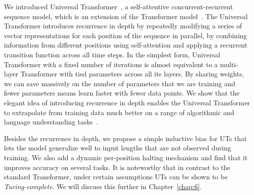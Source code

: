 We introduced Universal Transformer~\citep{Dehghani:ICLR:2019}, a self-attentive concurrent-recurrent sequence model, which is an extension of the Transformer model~\citep{vaswani2017attention}. The Universal Transformer introduces recurrence in depth by repeatedly modifying a series of vector representations for each position of the sequence in parallel, by combining information from different positions using self-attention and applying a recurrent transition function across all time steps. 
In the simplest form, Universal Transformer with a fixed number of iterations is almost equivalent to a multi-layer Transformer with tied parameters across all its layers. By sharing weights, we can save massively on the number of parameters that we are training and fewer parameters means learn faster with fewer data points. We show that the elegant idea of introducing recurrence in depth enables the Universal Transformer to extrapolate from training data much better on a range of algorithmic and language understanding tasks~\cite{Dehghani:ICLR:2019, Dehghani:2019:WSDM}.

Besides the recurrence in depth, we propose a simple inductive bias for UTs that lets the model generalize well to input lengths that are not observed during training.  We also add a dynamic per-position halting mechanism and find that it improves accuracy on several tasks.  It is noteworthy that in contrast to the standard Transformer, under certain assumptions UTs can be shown to be \emph{Turing-complete}. We will discuss this further in Chapter~\ref{chap:6}.

